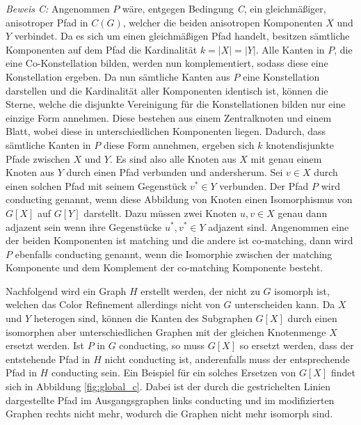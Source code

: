 \emph{Beweis C:} Angenommen $P$ wäre, entgegen Bedingung \emph{C}, ein gleichmäßiger, anisotroper Pfad in $C(G)$, welcher die beiden anisotropen Komponenten $X$ und $Y$ verbindet.
Da es sich um einen gleichmäßigen Pfad handelt, besitzen sämtliche Komponenten auf dem Pfad die Kardinalität $k=|X|=|Y|$.
Alle Kanten in $P$, die eine Co-Konstellation bilden, werden nun komplementiert, sodass diese eine Konstellation ergeben.
Da nun sämtliche Kanten aus $P$ eine Konstellation darstellen und die Kardinalität aller Komponenten identisch ist, können die Sterne, welche die disjunkte Vereinigung für die Konstellationen bilden nur eine einzige Form annehmen.
Diese bestehen aus einem Zentralknoten und einem Blatt, wobei diese in unterschiedlichen Komponenten liegen.
Dadurch, dass sämtliche Kanten in $P$ diese Form annehmen, ergeben sich $k$ knotendisjunkte Pfade zwischen $X$ und $Y$.
Es sind also alle Knoten aus $X$ mit genau einem Knoten aus $Y$ durch einen Pfad verbunden und andersherum.
Sei $v\in X$ durch einen solchen Pfad mit seinem Gegenstück $v^*\in Y$ verbunden.
Der Pfad $P$ wird conducting genannt, wenn diese Abbildung von Knoten einen Isomorphismus von $G[X]$ auf $G[Y]$ darstellt.
Dazu müssen zwei Knoten $u,v\in X$ genau dann adjazent sein wenn ihre Gegenstücke $u^*,v^*\in Y$ adjazent sind.
Angenommen eine der beiden Komponenten ist matching und die andere ist co-matching, dann wird $P$ ebenfalls conducting genannt, wenn die Isomorphie zwischen der matching Komponente und dem Komplement der co-matching Komponente besteht.

Nachfolgend wird ein Graph $H$ erstellt werden, der nicht zu $G$ isomorph ist, welchen das Color Refinement allerdings nicht von $G$ unterscheiden kann.
Da $X$ und $Y$ heterogen sind, können die Kanten des Subgraphen $G[X]$ durch einen isomorphen aber unterschiedlichen Graphen mit der gleichen Knotenmenge $X$ ersetzt werden.
Ist $P$ in $G$ conducting, so muss $G[X]$ so ersetzt werden, dass der entstehende Pfad in $H$ nicht conducting ist, anderenfalls muss der entsprechende Pfad in $H$ conducting sein.
Ein Beispiel für ein solches Ersetzen von $G[X]$ findet sich in Abbildung \ref{fig:global_c}.
Dabei ist der durch die gestrichelten Linien dargestellte Pfad im Ausgangsgraphen links conducting und im modifizierten Graphen rechts nicht mehr, wodurch die Graphen nicht mehr isomorph sind.

